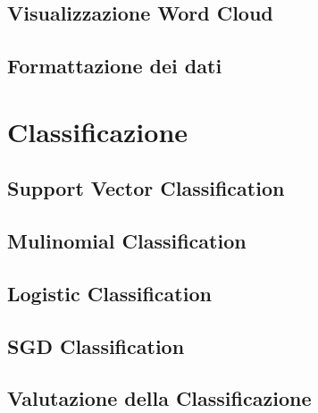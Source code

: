 \documentclass[12pt,oneside]{article}
\begin{document}
    \begin{enumerate}
    \subsection{Visualizzazione Word Cloud}
    \end{enumerate}

    \begin{enumerate}
    \subsection{Formattazione dei dati}
    \end{enumerate}


\section{Classificazione}
    \begin{enumerate}
    \subsection{Support Vector Classification}
    \end{enumerate}
   
    \begin{enumerate}
    \subsection{Mulinomial Classification}
    \end{enumerate}
    
    \begin{enumerate}
    \subsection{Logistic Classification}
    \end{enumerate}

    \begin{enumerate}
    \subsection{SGD Classification}
    \end{enumerate}
    
    \begin{enumerate}
    \subsection{Valutazione della Classificazione}
    \end{enumerate}
\end{document}
